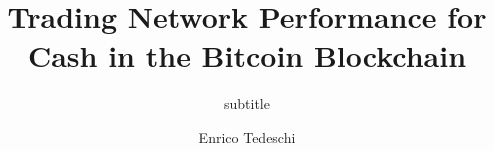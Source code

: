 \documentclass[USenglish]{uit-thesis}
\renewcommand{\bibname}{References}
\begin{document}
\renewcommand{\bibname}{References}

\title{Trading Network Performance for Cash in the Bitcoin Blockchain}
\subtitle{subtitle}			%
\author{Enrico Tedeschi}

\maketitle

\frontmatter

\end{document}

